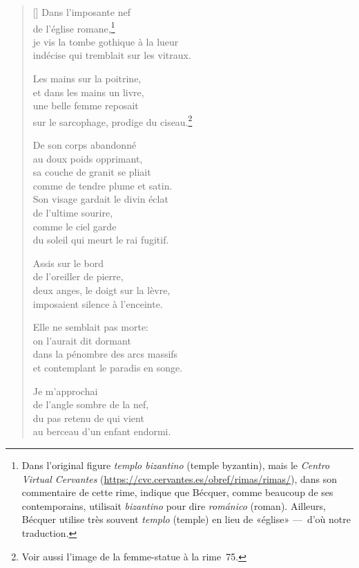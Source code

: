 \documentclass[a4paper,12pt]{book}
\begin{document}
\begin{verse}[\versewidth]
  Dans l'imposante nef \\
  de l'église romane,\footnote{Dans l'original figure \emph{templo bizantino}
  (temple byzantin), mais le \emph{Centro Virtual Cervantes}
  (\url{https://cvc.cervantes.es/obref/rimas/rimas/}), dans son
  commentaire de cette rime, indique que Bécquer, comme beaucoup de
  ses contemporains, utilisait \emph{bizantino} pour dire \emph{románico}
  (roman). Ailleurs, Bécquer utilise très souvent \emph{templo} (temple)
  en lieu de «église» ---~d'où notre traduction.} \\
  je vis la tombe gothique à la lueur \\
  indécise qui tremblait sur les vitraux.

  Les mains sur la poitrine, \\
  et dans les mains un livre, \\
  une belle femme reposait \\
  sur le sarcophage, prodige du ciseau.\footnote{Voir aussi l'image de
  la femme-statue à la rime~75.}

  De son corps abandonné \\
  au doux poids opprimant, \\
  sa couche de granit se pliait \\
  comme de tendre plume et satin. \\

  Son visage gardait le divin éclat \\
  de l'ultime sourire, \\
  comme le ciel garde \\
  du soleil qui meurt le rai fugitif.

  Assis sur le bord \\
  de l'oreiller de pierre, \\
  deux anges, le doigt sur la lèvre, \\
  imposaient silence à l'enceinte.

  Elle ne semblait pas morte: \\
  on l'aurait dit dormant \\
  dans la pénombre des arcs massifs \\
  et contemplant le paradis en songe.

  Je m'approchai \\
  de l'angle sombre de la nef, \\
  du pas retenu de qui vient \\
  au berceau d'un enfant endormi.


\end{verse}
\end{document}
